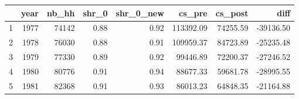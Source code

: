 \begin{tabular}{rrrrrrrr}
  \hline
 & year & nb\_hh & shr\_0 & shr\_0\_new & cs\_pre & cs\_post & diff \\ 
  \hline
1 & 1977 & 74142 & 0.88 & 0.92 & 113392.09 & 74255.59 & -39136.50 \\ 
  2 & 1978 & 76030 & 0.88 & 0.91 & 109959.37 & 84723.89 & -25235.48 \\ 
  3 & 1979 & 77330 & 0.89 & 0.92 & 99446.89 & 72200.37 & -27246.52 \\ 
  4 & 1980 & 80776 & 0.91 & 0.94 & 88677.33 & 59681.78 & -28995.55 \\ 
  5 & 1981 & 82368 & 0.91 & 0.93 & 86013.23 & 64848.35 & -21164.88 \\ 
   \hline
\end{tabular}
